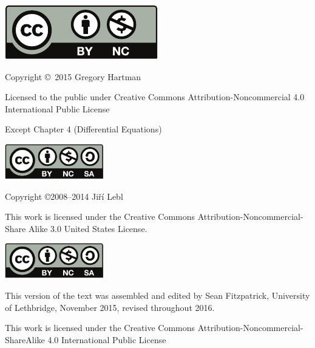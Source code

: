 \noindent\hskip -1in\begin{minipage}{2in}
\includegraphics{text/by-nc} 
\end{minipage}
\begin{minipage}{3in}
\noindent Copyright \copyright\ 2015 Gregory Hartman

Licensed to the public under Creative Commons Attribution-Noncommercial 4.0 International Public License
\end{minipage}

\bigskip

\bigskip

Except Chapter 4 (Differential Equations) 

\bigskip

\bigskip

\noindent\hskip -1in\begin{minipage}{2in}
\includegraphics[width=1.7in]{figures/license} 
\end{minipage}
\begin{minipage}{3in}
\noindent Copyright \copyright 2008--2014 Ji{\v r}\'i Lebl

This work is licensed under the Creative Commons
Attribution-Non\-commercial-Share Alike 3.0 United States License. 
\end{minipage}

\bigskip

\bigskip

\noindent\hskip-1in\begin{minipage}{2in}
\includegraphics[width=1.7in]{figures/license}
\end{minipage}
\begin{minipage}{3.3in}
This version of the text was assembled and edited by Sean Fitzpatrick, University of Lethbridge, November 2015, revised throughout 2016. 

This work is licensed under the Creative Commons Attribution-Noncommercial-ShareAlike 4.0 International Public License
\end{minipage}
